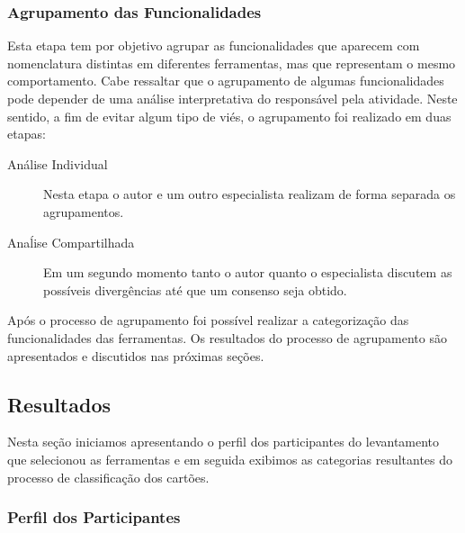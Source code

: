 \subsubsection{Agrupamento das Funcionalidades}\label{subsec:agrupamento_fucionalidades}

Esta etapa tem por objetivo agrupar as funcionalidades que aparecem com
nomenclatura distintas em diferentes ferramentas, mas que representam o mesmo
comportamento. Cabe ressaltar que o agrupamento de algumas funcionalidades pode
depender de uma análise interpretativa do responsável pela atividade. Neste
sentido, a fim de evitar algum tipo de viés, o agrupamento foi realizado em
duas etapas:

\begin{description}
	\item[Análise Individual] Nesta etapa o autor e um outro especialista
		realizam de forma separada os agrupamentos.
	\item[Anaĺise Compartilhada] Em um segundo momento tanto o autor quanto o
		es\-pe\-ci\-a\-lis\-ta discutem as possíveis divergências até que um
		consenso seja obtido.
\end{description}

Após o processo de agrupamento foi possível realizar a categorização das
funcionalidades das ferramentas. Os resultados do processo de agrupamento são
apresentados e discutidos nas próximas seções.

\subsection{Resultados}\label{sec:resultados}

Nesta seção iniciamos apresentando o perfil dos participantes do levantamento
que selecionou as ferramentas e em seguida exibimos as categorias resultantes do
processo de classificação dos cartões.

\subsubsection{Perfil dos Participantes}\label{ssub:perfil_participantes}

